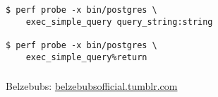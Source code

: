\documentclass[usenames,dvipsnames, 18pt, compress, aspectratio=169]{beamer}
\begin{document}
\begin{frame}[fragile]{}
    \frametitle{}
    \begin{center}
        \begin{verbatim}
$ perf probe -x bin/postgres \
    exec_simple_query query_string:string

$ perf probe -x bin/postgres \
    exec_simple_query%return
        \end{verbatim}
    \end{center}
\end{frame}

\renewcommand\UrlFont{\color{gray!50}\rmfamily\itshape}
\begin{frame}
    \frametitle{}
    \begin{center}
            {Belzebubs: \url{belzebubsofficial.tumblr.com}}
    \end{center}
\end{frame}
\end{document}
